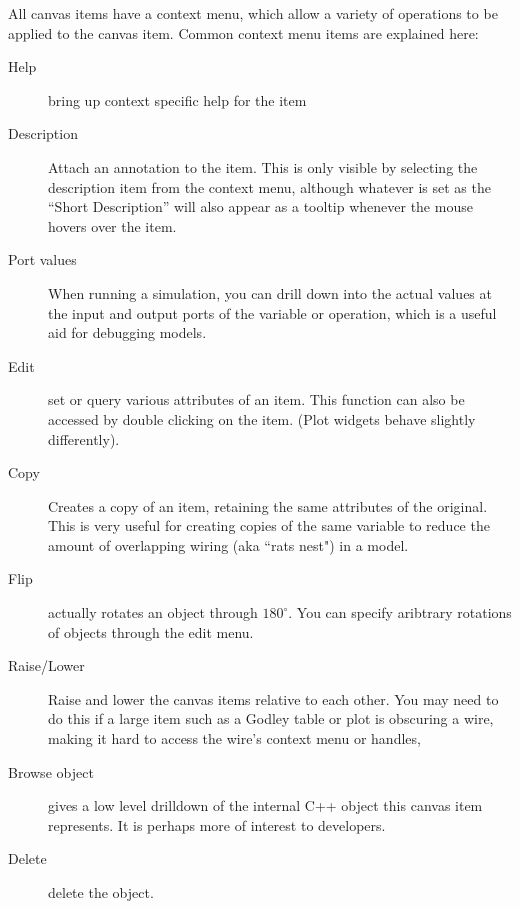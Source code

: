 All canvas items have a context menu, which allow a variety of
operations to be applied to the canvas item. Common context menu items
are explained here:
\begin{description}
\item[Help] bring up context specific help for the item
\item[Description] Attach an annotation to the item. This is only
visible by selecting the description item from the context menu,
although whatever is set as the ``Short Description'' will also appear
as a tooltip whenever the mouse hovers over the item.
\item[Port values] When running a simulation, you can drill down into
the actual values at the input and output ports of the variable or
operation, which is a useful aid for debugging models.
\item[Edit] set or query various attributes of an item. This function
can also be accessed by double clicking on the item. (Plot widgets
behave slightly differently).
\item[Copy] Creates a copy of an item, retaining the same attributes
of the original. This is very useful for creating copies of the same
variable to reduce the amount of overlapping wiring (aka ``rats nest")
in a model.
\item[Flip] actually rotates an object through $180^\circ$. You can
specify aribtrary rotations of objects through the edit menu.
\item[Raise/Lower] Raise and lower the canvas items relative to each
other. You may need to do this if a large item such as a Godley table
or plot is obscuring a wire, making it hard to access the wire's
context menu or handles,
\item[Browse object] gives a low level drilldown of the internal C++
object this canvas item represents. It is perhaps more of interest to
developers. 
\item[Delete] delete the object.
\end{description}

